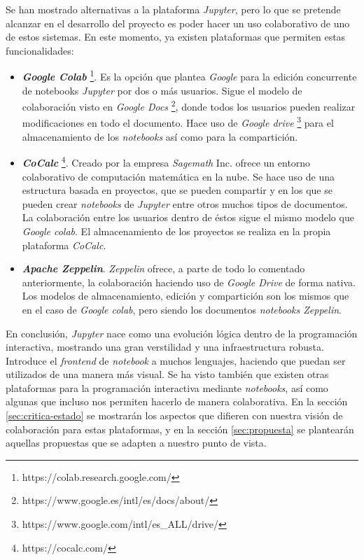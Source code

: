 \documentclass[11pt,spanish,listoffigures]{tfgetsinf}
\begin{document}
Se han mostrado alternativas a la plataforma \textit{Jupyter}, pero lo que se pretende alcanzar en el desarrollo del proyecto es poder hacer un uso colaborativo de uno de estos sistemas. En este momento, ya existen plataformas que permiten estas funcionalidades: 

\begin{itemize}

\item \textbf{\textit{Google Colab}} \footnote{https://colab.research.google.com/}. Es la opción que plantea \textit{Google} para la edición concurrente de notebooks \textit{Jupyter} por dos o más usuarios. Sigue el modelo de colaboración visto en \textit{Google Docs} \footnote{https://www.google.es/intl/es/docs/about/}, donde todos los usuarios pueden realizar modificaciones en todo el documento. Hace uso de \textit{Google drive} \footnote{https://www.google.com/intl/es\_ALL/drive/} para el almacenamiento de los \textit{notebooks} así como para la compartición.

\item \textbf{\textit{CoCalc}} \footnote{https://cocalc.com/}. Creado por la empresa \textit{Sagemath} Inc. ofrece un entorno colaborativo de computación matemática en la nube. Se hace uso de una estructura basada en proyectos, que se pueden compartir y en los que se pueden crear \textit{notebooks} de \textit{Jupyter} entre otros muchos tipos de documentos. La colaboración entre los usuarios dentro de éstos sigue el mismo modelo que \textit{Google colab}. El almacenamiento de los proyectos se realiza en la propia plataforma \textit{CoCalc}.

\item \textbf{\textit{Apache Zeppelin}}. \textit{Zeppelin} ofrece, a parte de todo lo comentado anteriormente, la colaboración haciendo uso de \textit{Google Drive} de forma nativa. Los modelos de almacenamiento, edición y compartición son los mismos que en el caso de \textit{Google colab}, pero siendo los documentos \textit{notebooks Zeppelin}.

\end{itemize}

En conclusión, \textit{Jupyter} nace como una evolución lógica dentro de la programación interactiva, mostrando una gran verstilidad y una infraestructura robusta. Introduce el \textit{frontend} de \textit{notebook} a muchos lenguajes, haciendo que puedan ser utilizados de una manera más visual. Se ha visto también que existen otras plataformas para la programación interactiva mediante \textit{notebooks}, así como algunas que incluso nos permiten hacerlo de manera colaborativa. En la sección \ref{sec:critica-estado} se mostrarán los aspectos que difieren con nuestra visión de colaboración para estas plataformas, y en la sección  \ref{sec:propuesta} se plantearán aquellas propuestas que se adapten a nuestro punto de vista.
\end{document}
